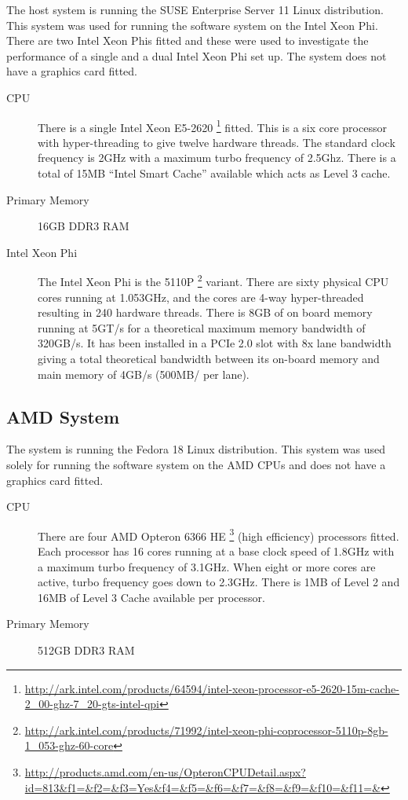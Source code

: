 The host system is running the SUSE Enterprise Server 11 Linux distribution.
This system was used for running the software system on the Intel Xeon Phi.
There are two Intel Xeon Phis fitted and these were used to investigate the
performance of a single and a dual Intel Xeon Phi set up. The system does not
have a graphics card fitted.

\begin{description}

\item[CPU] There is a single Intel Xeon E5-2620
\footnote{\url{http://ark.intel.com/products/64594/intel-xeon-processor-e5-2620-15m-cache-2_00-ghz-7_20-gts-intel-qpi}}
fitted. This is a six core processor with hyper-threading to give twelve
hardware threads. The standard clock frequency is 2GHz with a maximum turbo
frequency of 2.5Ghz. There is a total of 15MB ``Intel Smart Cache'' available
which acts as Level 3 cache.

\item[Primary Memory] 16GB DDR3 RAM

\item[Intel Xeon Phi] The Intel Xeon Phi is the 5110P
\footnote{\url{http://ark.intel.com/products/71992/intel-xeon-phi-coprocessor-5110p-8gb-1_053-ghz-60-core}}
variant. There are sixty physical CPU cores running at 1.053GHz, and the cores
are 4-way hyper-threaded resulting in 240 hardware threads. There is 8GB of on
board memory running at 5GT/s for a theoretical maximum memory bandwidth of
320GB/s. It has been installed in a PCIe 2.0 slot with 8x lane bandwidth giving
a total theoretical bandwidth between its on-board memory and main memory of
4GB/s (500MB/ per lane).

\end{description}

\subsection{AMD System}

The system is running the Fedora 18 Linux distribution. This system was used
solely for running the software system on the AMD CPUs and does not have a
graphics card fitted.

\begin{description}

\item[CPU] There are four AMD Opteron 6366 HE
\footnote{\url{http://products.amd.com/en-us/OpteronCPUDetail.aspx?id=813&f1=&f2=&f3=Yes&f4=&f5=&f6=&f7=&f8=&f9=&f10=&f11=&}}
(high efficiency) processors fitted. Each processor has 16 cores running at a
base clock speed of 1.8GHz with a maximum turbo frequency of 3.1GHz. When eight
or more cores are active, turbo frequency goes down to 2.3GHz. There is 1MB of
Level 2 and 16MB of Level 3 Cache available per processor.

\item[Primary Memory] 512GB DDR3 RAM

\end{description}

